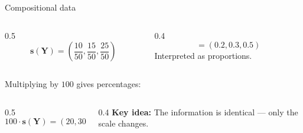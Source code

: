 \begin{frame}{Compositional data}
{\begin{columns}
    \begin{column}{0.5\textwidth}
        \[
        \mathbf{s}(\mathbf{Y}) = \left(\frac{10}{50}, \frac{15}{50}, \frac{25}{50}\right)
        \]
    \end{column}
    \begin{column}{0.4\textwidth}
        \[
        = (0.2, 0.3, 0.5)
        \]
        Interpreted as proportions.
    \end{column}
\end{columns}

\vspace{0.2cm}
Multiplying by $100$ gives percentages:
\vspace{0.2cm}

\begin{columns}
    \begin{column}{0.5\textwidth}
        \[
        100 \cdot \mathbf{s}(\mathbf{Y}) = (20, 30, 50)
        \]
    \end{column}
    \begin{column}{0.4\textwidth}
        \textbf{Key idea:} The information is identical — only the scale changes.
    \end{column}
\end{columns}


}

\end{frame}



    













